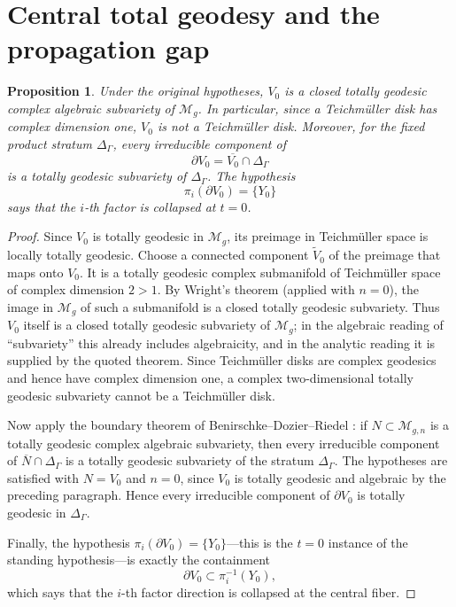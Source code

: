 \documentclass[12pt]{article}
\theoremstyle{plain}
\newtheorem{proposition}[theorem]{Proposition}
\theoremstyle{definition}
\theoremstyle{remark}
\newcommand{\M}{\mathcal M}
\begin{document}
\section{Central total geodesy and the propagation gap}\label{sec:central}

\begin{proposition}\label{prop:central-structure}
Under the original hypotheses, \(V_0\) is a closed totally geodesic complex algebraic subvariety of \(\M_g\).  In particular, since a Teichmüller disk has complex dimension one, \(V_0\) is not a Teichmüller disk.  Moreover, for the fixed product stratum \(\Delta_\Gamma\), every irreducible component of
\[
\partial V_0=\overline{V_0}\cap \Delta_\Gamma
\]
is a totally geodesic subvariety of \(\Delta_\Gamma\).  The hypothesis
\[
\pi_i(\partial V_0)=\{Y_0\}
\]
says that the \(i\)-th factor is collapsed at \(t=0\).
\end{proposition}

\begin{proof}
Since \(V_0\) is totally geodesic in \(\M_g\), its preimage in Teichmüller space is locally totally geodesic.  Choose a connected component \(\widetilde V_0\) of the preimage that maps onto \(V_0\).  It is a totally geodesic complex submanifold of Teichmüller space of complex dimension \(2>1\).  By Wright's theorem \cite[Theorem~1.1]{Wri17} (applied with \(n=0\)), the image in \(\M_g\) of such a submanifold is a closed totally geodesic subvariety.  Thus \(V_0\) itself is a closed totally geodesic subvariety of \(\M_g\); in the algebraic reading of ``subvariety'' this already includes algebraicity, and in the analytic reading it is supplied by the quoted theorem.  Since Teichmüller disks are complex geodesics and hence have complex dimension one, a complex two-dimensional totally geodesic subvariety cannot be a Teichmüller disk.

Now apply the boundary theorem of Benirschke--Dozier--Riedel \cite[Theorem~1.4]{BDR}: if \(N\subset \M_{g,n}\) is a totally geodesic complex algebraic subvariety, then every irreducible component of \(\overline N\cap \Delta_\Gamma\) is a totally geodesic subvariety of the stratum \(\Delta_\Gamma\).  The hypotheses are satisfied with \(N=V_0\) and \(n=0\), since \(V_0\) is totally geodesic and algebraic by the preceding paragraph.  Hence every irreducible component of \(\partial V_0\) is totally geodesic in \(\Delta_\Gamma\).

Finally, the hypothesis \(\pi_i(\partial V_0)=\{Y_0\}\)---this is the \(t=0\) instance of the standing hypothesis---is exactly the containment
\[
\partial V_0\subset \pi_i^{-1}(Y_0),
\]
which says that the \(i\)-th factor direction is collapsed at the central fiber.
\end{proof}
\end{document}
